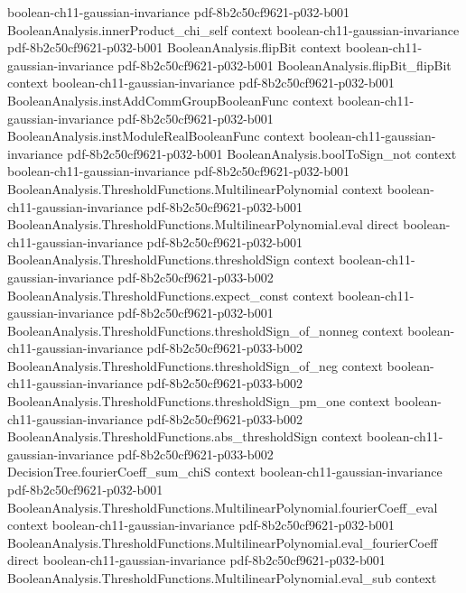 \begin{lemma}
  {boolean-ch11-gaussian-invariance}
  {pdf-8b2c50cf9621-p032-b001}
\proofstep
  {BooleanAnalysis.innerProduct_chi_self}
  {context}
  {boolean-ch11-gaussian-invariance}
  {pdf-8b2c50cf9621-p032-b001}
\proofstep
  {BooleanAnalysis.flipBit}
  {context}
  {boolean-ch11-gaussian-invariance}
  {pdf-8b2c50cf9621-p032-b001}
\proofstep
  {BooleanAnalysis.flipBit_flipBit}
  {context}
  {boolean-ch11-gaussian-invariance}
  {pdf-8b2c50cf9621-p032-b001}
\proofstep
  {BooleanAnalysis.instAddCommGroupBooleanFunc}
  {context}
  {boolean-ch11-gaussian-invariance}
  {pdf-8b2c50cf9621-p032-b001}
\proofstep
  {BooleanAnalysis.instModuleRealBooleanFunc}
  {context}
  {boolean-ch11-gaussian-invariance}
  {pdf-8b2c50cf9621-p032-b001}
\proofstep
  {BooleanAnalysis.boolToSign_not}
  {context}
  {boolean-ch11-gaussian-invariance}
  {pdf-8b2c50cf9621-p032-b001}
\proofstep
  {BooleanAnalysis.ThresholdFunctions.MultilinearPolynomial}
  {context}
  {boolean-ch11-gaussian-invariance}
  {pdf-8b2c50cf9621-p032-b001}
\proofstep
  {BooleanAnalysis.ThresholdFunctions.MultilinearPolynomial.eval}
  {direct}
  {boolean-ch11-gaussian-invariance}
  {pdf-8b2c50cf9621-p032-b001}
\proofstep
  {BooleanAnalysis.ThresholdFunctions.thresholdSign}
  {context}
  {boolean-ch11-gaussian-invariance}
  {pdf-8b2c50cf9621-p033-b002}
\proofstep
  {BooleanAnalysis.ThresholdFunctions.expect_const}
  {context}
  {boolean-ch11-gaussian-invariance}
  {pdf-8b2c50cf9621-p032-b001}
\proofstep
  {BooleanAnalysis.ThresholdFunctions.thresholdSign_of_nonneg}
  {context}
  {boolean-ch11-gaussian-invariance}
  {pdf-8b2c50cf9621-p033-b002}
\proofstep
  {BooleanAnalysis.ThresholdFunctions.thresholdSign_of_neg}
  {context}
  {boolean-ch11-gaussian-invariance}
  {pdf-8b2c50cf9621-p033-b002}
\proofstep
  {BooleanAnalysis.ThresholdFunctions.thresholdSign_pm_one}
  {context}
  {boolean-ch11-gaussian-invariance}
  {pdf-8b2c50cf9621-p033-b002}
\proofstep
  {BooleanAnalysis.ThresholdFunctions.abs_thresholdSign}
  {context}
  {boolean-ch11-gaussian-invariance}
  {pdf-8b2c50cf9621-p033-b002}
\proofstep
  {DecisionTree.fourierCoeff_sum_chiS}
  {context}
  {boolean-ch11-gaussian-invariance}
  {pdf-8b2c50cf9621-p032-b001}
\proofstep
  {BooleanAnalysis.ThresholdFunctions.MultilinearPolynomial.fourierCoeff_eval}
  {context}
  {boolean-ch11-gaussian-invariance}
  {pdf-8b2c50cf9621-p032-b001}
\proofstep
  {BooleanAnalysis.ThresholdFunctions.MultilinearPolynomial.eval_fourierCoeff}
  {direct}
  {boolean-ch11-gaussian-invariance}
  {pdf-8b2c50cf9621-p032-b001}
\proofstep
  {BooleanAnalysis.ThresholdFunctions.MultilinearPolynomial.eval_sub}
  {context}

\end{lemma}
